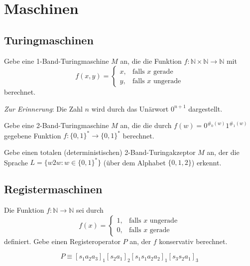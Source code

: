 \documentclass[german,headsepline]{scrartcl}
\theoremstyle{definition}
\begin{document}
	\section{Maschinen}
	
	\subsection{Turingmaschinen}
	\begin{question}[subtitle={Klausur 2012}]
		Gebe eine 1-Band-Turingmaschine $M$ an,
		die die Funktion $f:\mathbb{N}\times\mathbb{N}\to\mathbb{N}$ mit
		\[f(x,y)=\begin{cases}
			x, &\text{falls $x$ gerade} \\
			y, &\text{falls $x$ ungerade}
		\end{cases}\]
		berechnet.
		
		\textit{Zur Erinnerung}: Die Zahl $n$ wird durch das Unärwort $0^{n+1}$ dargestellt.
	\end{question}
	
	\begin{question}[subtitle={Klausur 2014}]
		Gebe eine 2-Band-Turingmaschine $M$ an, die die durch $f(w)=0^{\#_0(w)}1^{\#_1(w)}$ gegebene Funktion $f:\{0,1\}^*\to\{0,1\}^*$ berechnet.
	\end{question}
	
	\begin{question}[subtitle={Klausur 2015}]
		Gebe einen totalen (deterministischen) 2-Band-Turingakzeptor $M$ an,
		der die Sprache $L=\{w2w\colon w\in\{0,1\}^*\}$ (über dem Alphabet $\{0,1,2\}$) erkennt.
	\end{question}
	
	\subsection{Registermaschinen}
	\begin{question}[subtitle={Klausur 2015}]
		Die Funktion $f:\mathbb{N}\to\mathbb{N}$ sei durch
		\[f(x)=\begin{cases}
			1, &\text{falls $x$ ungerade} \\
			0, &\text{falls $x$ gerade}
		\end{cases}\]
		definiert.
		Gebe einen Registeroperator $P$ an, der $f$ konservativ berechnet.
	\end{question}
	\begin{solution}
		\[P\equiv[s_1a_2a_3]_1[s_2a_1]_2[s_1s_1a_2a_2]_1[s_3s_2a_1]_3\]
	\end{solution}
	
\end{document}
